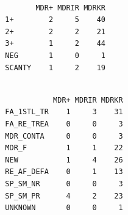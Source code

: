 \documentclass[
]{report}
\newenvironment{Shaded}{\begin{snugshade}}{\end{snugshade}}
\newcommand{\FunctionTok}[1]{\textcolor[rgb]{0.28,0.35,0.67}{#1}}
\newcommand{\NormalTok}[1]{\textcolor[rgb]{0.00,0.23,0.31}{#1}}
\newcommand{\SpecialCharTok}[1]{\textcolor[rgb]{0.37,0.37,0.37}{#1}}
\begin{document}
\begin{Shaded}
\end{Shaded}

\begin{verbatim}
        
         MDR+ MDRIR MDRKR
  1+        2     5    40
  2+        2     2    21
  3+        1     2    44
  NEG       1     0     1
  SCANTY    1     2    19
\end{verbatim}

\begin{Shaded}
\end{Shaded}

\begin{verbatim}
            
             MDR+ MDRIR MDRKR
  FA_1STL_TR    1     3    31
  FA_RE_TREA    0     0     3
  MDR_CONTA     0     0     3
  MDR_F         1     1    22
  NEW           1     4    26
  RE_AF_DEFA    0     1    13
  SP_SM_NR      0     0     3
  SP_SM_PR      4     2    23
  UNKNOWN       0     0     1
\end{verbatim}
\end{document}
